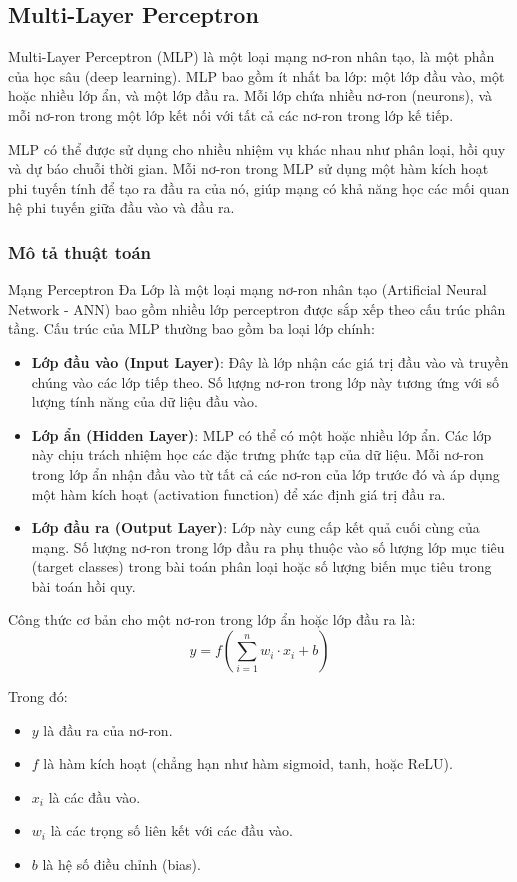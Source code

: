 
\subsection{Multi-Layer Perceptron}

Multi-Layer Perceptron (MLP) là một loại mạng nơ-ron nhân tạo, là một phần của học sâu (deep learning). MLP bao gồm ít nhất ba lớp: một lớp đầu vào, một hoặc nhiều lớp ẩn, và một lớp đầu ra. Mỗi lớp chứa nhiều nơ-ron (neurons), và mỗi nơ-ron trong một lớp kết nối với tất cả các nơ-ron trong lớp kế tiếp.

MLP có thể được sử dụng cho nhiều nhiệm vụ khác nhau như phân loại, hồi quy và dự báo chuỗi thời gian. Mỗi nơ-ron trong MLP sử dụng một hàm kích hoạt phi tuyến tính để tạo ra đầu ra của nó, giúp mạng có khả năng học các mối quan hệ phi tuyến giữa đầu vào và đầu ra.
\subsubsection{Mô tả thuật toán}
Mạng Perceptron Đa Lớp là một loại mạng nơ-ron nhân tạo (Artificial Neural Network - ANN) bao gồm nhiều lớp perceptron được sắp xếp theo cấu trúc phân tầng. Cấu trúc của MLP thường bao gồm ba loại lớp chính:

\begin{itemize}
    \item \textbf{Lớp đầu vào (Input Layer)}: Đây là lớp nhận các giá trị đầu vào và truyền chúng vào các lớp tiếp theo. Số lượng nơ-ron trong lớp này tương ứng với số lượng tính năng của dữ liệu đầu vào.
    \item \textbf{Lớp ẩn (Hidden Layer)}: MLP có thể có một hoặc nhiều lớp ẩn. Các lớp này chịu trách nhiệm học các đặc trưng phức tạp của dữ liệu. Mỗi nơ-ron trong lớp ẩn nhận đầu vào từ tất cả các nơ-ron của lớp trước đó và áp dụng một hàm kích hoạt (activation function) để xác định giá trị đầu ra.
    \item \textbf{Lớp đầu ra (Output Layer)}: Lớp này cung cấp kết quả cuối cùng của mạng. Số lượng nơ-ron trong lớp đầu ra phụ thuộc vào số lượng lớp mục tiêu (target classes) trong bài toán phân loại hoặc số lượng biến mục tiêu trong bài toán hồi quy.
\end{itemize}

Công thức cơ bản cho một nơ-ron trong lớp ẩn hoặc lớp đầu ra là:
\[
y = f\left( \sum_{i=1}^{n} w_i \cdot x_i + b \right)
\]

Trong đó:
\begin{itemize}
    \item \( y \) là đầu ra của nơ-ron.
    \item \( f \) là hàm kích hoạt (chẳng hạn như hàm sigmoid, tanh, hoặc ReLU).
    \item \( x_i \) là các đầu vào.
    \item \( w_i \) là các trọng số liên kết với các đầu vào.
    \item \( b \) là hệ số điều chỉnh (bias).
\end{itemize}

